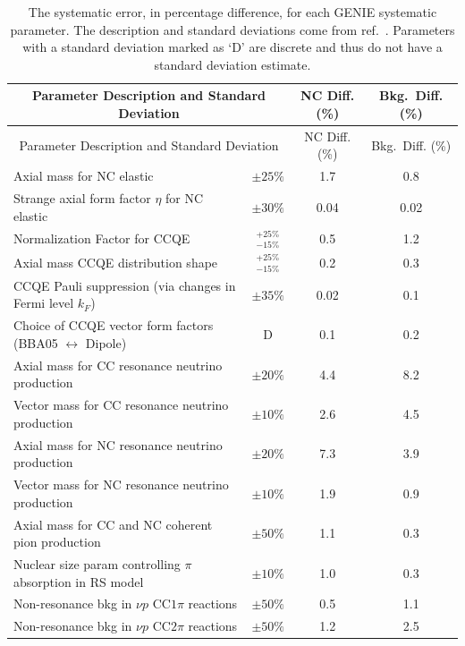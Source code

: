 \singlespacing
\begin{longtable}{p{3in} c @{\hskip 0.25in} c c}
  \caption[GENIE Systematic Errors]{The systematic error, in percentage difference, for each GENIE systematic parameter. The description and standard deviations come from ref.~\cite{ref:GENIE, ref:TNGENIE}. Parameters with a standard deviation marked as `D' are discrete and thus do not have a standard deviation estimate.} \tabularnewline
  \hline\hline
  \multicolumn{2}{c}{Parameter Description and Standard Deviation} & NC Diff. (\%) & Bkg.~Diff. (\%) \\
  \hline \endfirsthead
  \hline\hline
  \multicolumn{2}{c}{Parameter Description and Standard Deviation} & NC Diff. (\%) & Bkg.~Diff. (\%) \\
  \hline \endhead
  Axial mass for NC elastic & $\pm25\%$ & 1.7 & 0.8 \\
  Strange axial form factor $\eta$ for NC elastic & $\pm30\%$ & 0.04 & 0.02 \\
  Normalization Factor for CCQE & $^{+25\%}_{-15\%}$ & 0.5 & 1.2 \\
  Axial mass CCQE distribution shape & $^{+25\%}_{-15\%}$ & 0.2 & 0.3 \\
  CCQE Pauli suppression (via changes in Fermi level $k_F$) & $\pm35\%$ & 0.02 & 0.1 \\
  Choice of CCQE vector form factors \newline (BBA05 $\leftrightarrow$ Dipole) & D & 0.1 & 0.2 \\
  Axial mass for CC resonance neutrino production & $\pm20\%$ & 4.4 & 8.2 \\
  Vector mass for CC resonance neutrino production & $\pm10\%$ & 2.6 & 4.5 \\
  Axial mass for NC resonance neutrino production & $\pm20\%$ & 7.3 & 3.9 \\
  Vector mass for NC resonance neutrino production & $\pm10\%$ & 1.9 & 0.9 \\
  Axial mass for CC and NC coherent pion \newline production & $\pm50\%$ & 1.1 & 0.3 \\
  Nuclear size param controlling $\pi$ absorption in RS model & $\pm10\%$ & 1.0 & 0.3 \\
  Non-resonance bkg in $\nu p$ CC$1\pi$ reactions & $\pm50\%$ & 0.5 & 1.1 \\
  Non-resonance bkg in $\nu p$ CC$2\pi$ reactions & $\pm50\%$ & 1.2 & 2.5 \\

\end{longtable}
